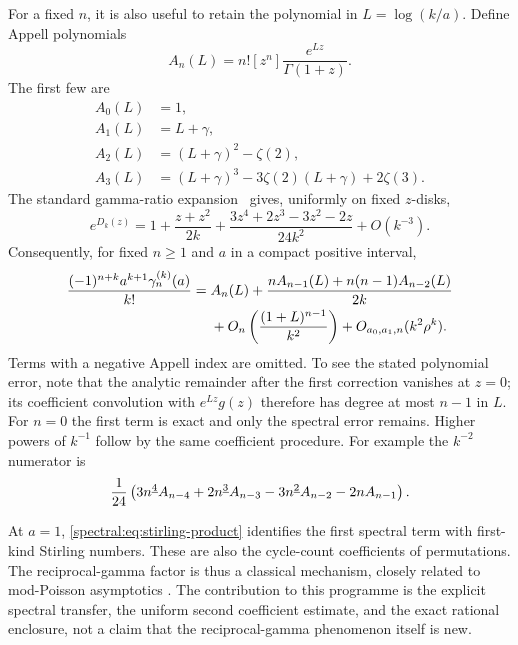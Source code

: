 For a fixed \(n\), it is also useful to retain the polynomial in
\(L=\log(k/a)\). Define Appell polynomials
\[
A_n(L)=n![z^n]\frac{e^{Lz}}{\Gamma(1+z)}.
\]
The first few are
\begin{align*}
A_0(L)&=1,\\
A_1(L)&=L+\gamma,\\
A_2(L)&=(L+\gamma)^2-\zeta(2),\\
A_3(L)&=(L+\gamma)^3-3\zeta(2)(L+\gamma)+2\zeta(3).
\end{align*}
The standard gamma-ratio expansion~\cite{hstruct:DLMF} gives, uniformly on
fixed \(z\)-disks,
\[
e^{D_k(z)}=
1+\frac{z+z^2}{2k}
 +\frac{3z^4+2z^3-3z^2-2z}{24k^2}+O(k^{-3}).
\]
Consequently, for fixed \(n\ge1\) and \(a\) in a compact positive
interval,
\begin{align}
\frac{(-1)^{n+k}a^{k+1}\gamma_n^{(k)}(a)}{k!}
={}&A_n(L)
 +\frac{nA_{n-1}(L)+n(n-1)A_{n-2}(L)}{2k}\notag\\
&+O_n\left(\frac{(1+L)^{n-1}}{k^2}\right)
 +O_{a_0,a_1,n}(k^2\rho^k).
\label{spectral:eq:fixed-index}
\end{align}
Terms with a negative Appell index are omitted.
To see the stated polynomial error, note that the analytic
remainder after the first correction vanishes at \(z=0\);
its coefficient convolution with \(e^{Lz}g(z)\) therefore has
degree at most \(n-1\) in \(L\). For \(n=0\) the first term is
exact and only the spectral error remains.
Higher powers of \(k^{-1}\) follow by the same coefficient procedure.
For example the \(k^{-2}\) numerator is
\[
\frac1{24}\left(
3n^{\underline{4}}A_{n-4}
+2n^{\underline{3}}A_{n-3}
-3n^{\underline{2}}A_{n-2}
-2nA_{n-1}\right).
\]

At \(a=1\), \eqref{spectral:eq:stirling-product} identifies the first spectral
term with first-kind Stirling numbers. These are also the cycle-count
coefficients of permutations. The reciprocal-gamma factor is thus a
classical mechanism, closely related to mod-Poisson asymptotics
\cite{spectral:KowalskiNikeghbali}. The contribution to this programme is the
explicit spectral transfer, the uniform second coefficient estimate,
and the exact rational enclosure, not a claim that the
reciprocal-gamma phenomenon itself is new.



